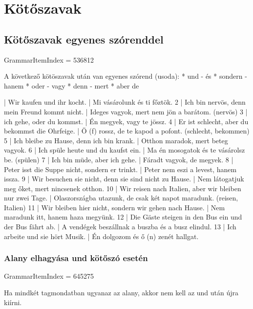 \documentclass{article}
\newenvironment{desc}{\verbatim}{\endverbatim}
\newenvironment{exmp}{\verbatim}{\endverbatim}
\begin{document}
\section{Kötőszavak}

\subsection{Kötőszavak egyenes szórenddel}

GrammarItemIndex = 536812

\begin{desc}
A következő kötöszavak után van egyenes szórend (usoda):
* und - és
* sondern - hanem
* oder - vagy
* denn - mert
* aber  de
\end{desc}

\begin{exmp}
1 | Wir kaufen und ihr kocht. | Mi vásárolunk és ti főztök.
2 | Ich bin nervös, denn mein Freund kommt nicht. | Ideges vagyok, mert nem jön a barátom. (nervös)
3 | ich gehe, oder du kommst. | Én megyek, vagy te jössz.
4 | Er ist schlecht, aber du bekommst die Ohrfeige. | Ö (f) rossz, de te kapod a pofont. (schlecht, bekommen)
5 | Ich bleibe zu Hause, denn ich bin krank. | Otthon maradok, mert beteg vagyok.
6 | Ich spüle heute und du kaufst ein. | Ma én mosogatok és te vásárolsz be. (spülen)
7 | Ich bin müde, aber ich gehe. | Fáradt vagyok, de megyek.
8 | Peter isst die Suppe nicht, sondern er trinkt. | Peter nem eszi a levest, hanem issza.
9 | Wir besuchen sie nicht, denn sie sind nicht zu Hause. | Nem látogatjuk meg őket, mert nincsenek otthon.
10 | Wir reisen nach Italien, aber wir bleiben nur zwei Tage. | Olaszországba utazunk, de csak két napot maradunk. (reisen, Italien)
11 | Wir bleiben hier nicht, sondern wir gehen nach Hause. | Nem maradunk itt, hanem haza megyünk.
12 | Die Gäste steigen in den Bus ein und der Bus fährt ab. | A vendégek beszállnak a buszba és a busz elindul.
13 | Ich arbeite und sie hört Musik. | Én dolgozom és ő (n) zenét hallgat.
\end{exmp}

\subsubsection{Alany elhagyása und kötőszó esetén}

GrammarItemIndex = 645275

\begin{desc}
Ha mindkét tagmondatban ugyanaz az alany, akkor nem kell az und után újra kiírni.
\end{desc}
\end{document}
